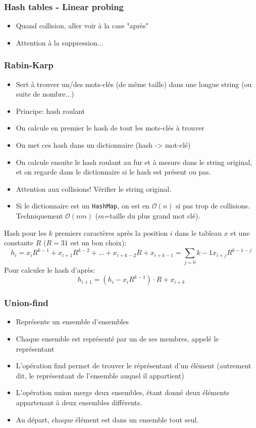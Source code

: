 \documentclass[8pt,aspectratio=169]{beamer}
\begin{document}
\begin{frame}
\frametitle{Hash tables - Linear probing}
\begin{itemize}
	\item Quand collision, aller voir à la case "après"
	\item Attention à la suppression...
\end{itemize}
\end{frame}

\begin{frame}
\frametitle{Rabin-Karp}
\begin{itemize}
	\item Sert à trouver un/des mots-clés (de même taille) dans une longue string (ou suite de nombre...)
	\item Principe: hash roulant
	\item On calcule en premier le hash de tout les mots-clés à trouver
	\item On met ces hash dans un dictionnaire (hash -> mot-clé)
	\item On calcule ensuite le hash roulant au fur et à mesure dans le string original, et on regarde dans le dictionnaire si le hash est présent ou pas.
	\item Attention aux collisions! Vérifier le string original.
	\item Si le dictionnaire est un \texttt{HashMap}, on est en $\mathcal{O}(n)$ si pas trop de collisions. Techniquement $\mathcal{O}(nm)$ ($m$=taille du plus grand mot clé).
\end{itemize}
Hash pour les $k$ premiers caractères après la position $i$ dans le tableau $x$ et une constante $R$ ($R=31$ est un bon choix):
$$h_i = x_i R^{k-1} + x_{i+1} R^{k-2} + \ldots + x_{i+k-2} R + x_{i+k-1} = \sum_{j=0}{k-1} x_{i+j} R^{k-1-j}$$
Pour calculer le hash d'après:
$$h_{i+1} = (h_i - x_i R^{k-1})\cdot R + x_{i+k}$$

\end{frame}

\begin{frame}
\frametitle{Union-find}
\begin{itemize}
	\item Représente un ensemble d'ensembles
	\item Chaque ensemble est représenté par un de ses membres, appelé le représentant
	\item L'opération find permet de trouver le réprésentant d'un élément (autrement dit, le représentant de l'ensemble auquel il appartient)
	\item L'opération union merge deux ensembles, étant donné deux éléments appartenant à deux ensembles différents.
	\item Au départ, chaque élément est dans un ensemble tout seul.
\end{itemize}
\end{frame}
\end{document}

